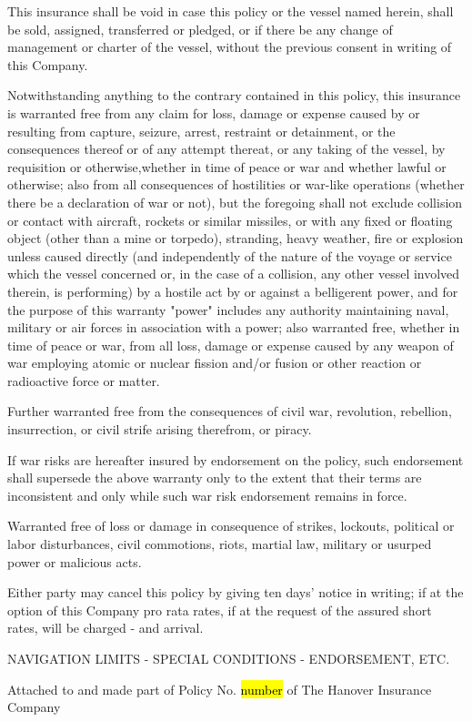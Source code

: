 \documentclass[10pt]{article}
\begin{document}
\begin{linenumbers}
This  insurance  shall  be  void  in  case  this  policy  or  the  vessel  named  herein,  shall  be  sold,  assigned,  transferred or  pledged,  or  if  there  be  any  change  of  management  or  charter  of  the  vessel,  without  the  previous  consent  in writing of this Company.

Notwithstanding   anything   to   the   contrary   contained   in   this   policy,   this  insurance   is   warranted free from  any  claim  for  loss,  damage  or  expense  caused  by  or  resulting  from  capture,  seizure,  arrest,  restraint  or  detainment,	or  the  consequences  thereof  or  of  any  attempt  thereat,  or  any  taking  of  the  vessel,  by  requisition  or  otherwise,whether  in  time  of  peace  or  war  and  whether  lawful  or  otherwise;  also  from  all  consequences  of  hostilities  or  war-like  operations (whether  there  be  a  declaration  of   war  or  not),  but  the  foregoing  shall  not  exclude  collision  or contact   with   aircraft,   rockets   or   similar   missiles,   or   with   any   fixed   or   floating   object (other   than   a   mine   or torpedo),  stranding,  heavy  weather,  fire  or  explosion  unless  caused  directly (and   independently   of   the   nature   of the  voyage  or  service  which  the  vessel  concerned  or,  in  the  case  of  a  collision,  any  other  vessel  involved  therein, is  performing)  by  a  hostile  act  by  or  against  a  belligerent  power,  and  for  the  purpose  of  this  warranty  "power" includes  any  authority  maintaining  naval,  military  or  air  forces  in  association  with  a  power;  also  warranted  free, whether  in  time  of  peace  or  war,  from  all  loss,  damage  or  expense  caused  by  any  weapon  of  war  employing  atomic or nuclear fission and/or fusion or other reaction or radioactive force or matter.

Further  warranted  free  from  the  consequences  of  civil  war,  revolution,  rebellion,  insurrection,  or  civil  strife arising therefrom, or piracy.

If  war  risks  are  hereafter  insured  by  endorsement  on  the  policy,  such  endorsement  shall  supersede  the  above warranty  only  to  the  extent  that  their  terms  are  inconsistent  and  only   while  such  war  risk   endorsement  remains in force.

Warranted   free   of   loss   or   damage   in   consequence   of   strikes,   lockouts,   political   or   labor   disturbances,   civil commotions, riots, martial law, military or usurped power or malicious acts.

Either  party  may  cancel  this  policy  by  giving  ten  days'  notice  in  writing;  if  at  the  option  of  this  Company pro rata rates, if at the request of the assured short rates, will be charged - and arrival.

NAVIGATION LIMITS - SPECIAL CONDITIONS - ENDORSEMENT, ETC.

Attached to and made part of Policy No. \hl{number} of The Hanover Insurance Company

\end{linenumbers}
\end{document}
